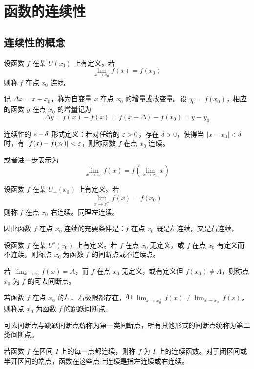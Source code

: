 \chapter{函数的连续性}

\section{连续性的概念}

\begin{definition}[连续性]
    设函数 $f$ 在某 $U(x_0)$ 上有定义。若
    $$\lim_{x\to x_0}f(x) = f(x_0)$$
    则称 $f$ 在点 $x_0$ 连续。
\end{definition}

记 $\Delta x = x-x_0$，称为自变量 $x$ 在点 $x_0$ 的增量或改变量。设 $y_0=f(x_0)$，相应的函数 $y$ 在点 $x_0$ 的增量记为
$$\Delta y = f(x)-f(x) = f(x+\Delta)-f(x_0) = y-y_0$$ 

连续性的 $\varepsilon-\delta$ 形式定义：若对任给的 $\varepsilon>0$，存在 $\delta>0$，使得当 $|x-x_0|<\delta$ 时，有 $|f(x)-f(x_0)|<\varepsilon$，则称函数 $f$ 在点 $x_0$ 连续。

或者进一步表示为
$$\lim_{x\to x_0}f(x) = f\left(\lim_{x\to x_0}x\right)$$

\begin{definition}
    设函数 $f$ 在某 $U_+(x_0)$ 上有定义。若
    $$\lim_{x\to x_0^+}f(x) = f(x_0)$$
    则称 $f$ 在点 $x_0$ 右连续。同理左连续。
\end{definition}

因此函数 $f$ 在点 $x_0$ 连续的充要条件是：$f$ 在点 $x_0$ 既是左连续，又是右连续。

\begin{definition}[间断点]
    设函数 $f$ 在某 $U^\circ(x_0)$ 上有定义。若 $f$ 在点 $x_0$ 无定义，或 $f$ 在点 $x_0$ 有定义而不连续，则称点 $x_0$ 为函数 $f$ 的间断点或不连续点。
\end{definition}

若 $\displaystyle\lim_{x\to x_0}f(x)=A$，而 $f$ 在点 $x_0$ 无定义，或有定义但 $f(x_0)\ne A$，则称点 $x_0$ 为 $f$ 的可去间断点。

若函数 $f$ 在点 $x_0$ 的左、右极限都存在，但 $\displaystyle\lim_{x\to x_0^+}f(x) \ne \lim_{x\to x_0^-}f(x)$，则称点 $x_0$ 为函数 $f$ 的跳跃间断点。

可去间断点与跳跃间断点统称为第一类间断点，所有其他形式的间断点统称为第二类间断点。

若函数 $f$ 在区间 $I$ 上的每一点都连续，则称 $f$ 为 $I$ 上的连续函数。对于闭区间或半开区间的端点，函数在这些点上连续是指左连续或右连续。

